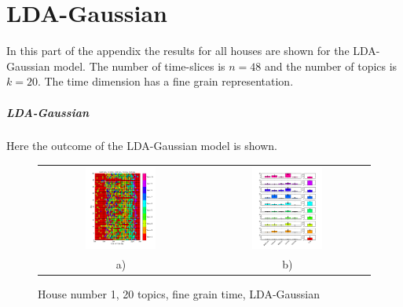 \chapter{LDA-Gaussian}
In this part of the appendix the results for all houses are shown for the LDA-Gaussian model. The number of time-slices is $n=48$ and the number of topics is $k=20$. The time dimension has a fine grain representation.

\paragraph{LDA-Gaussian}
Here the outcome of the LDA-Gaussian model is shown.

\begin{figure}[h!]
 \centering
 \begin{tabular}{c c}
  \includegraphics[width=0.45\textwidth]{Pictures/Gaus/fine/DayHN1TS48k20fine.png}
  &
  \includegraphics[width=0.45\textwidth]{Pictures/Gaus/fine/TopHN1TS48k20fine.png}\\
  a) & b)
 \end{tabular}
  \caption{House number 1, 20 topics, fine grain time, LDA-Gaussian}
\end{figure}

